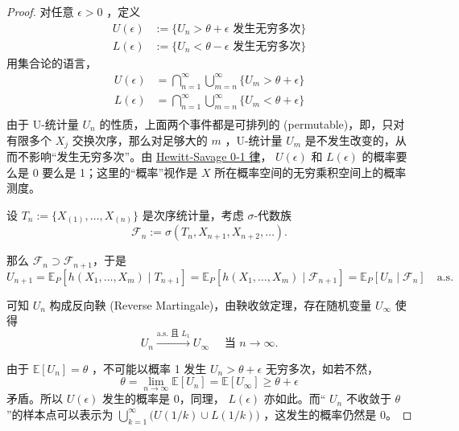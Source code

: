 \begin{proof}

对任意 $\epsilon > 0$ ，定义
\[\begin{aligned} U(\epsilon) &:= \bigl\{ U_n > \theta + \epsilon \text{ 发生无穷多次} \bigr\}\\ L(\epsilon) &:= \bigl\{ U_n < \theta - \epsilon \text{ 发生无穷多次} \bigr\} \end{aligned}\]
用集合论的语言，
\[\begin{aligned} U(\epsilon) &= \bigcap_{n=1}^{\infty} \bigcup_{m=n}^{\infty} \{ U_m > \theta + \epsilon \}\\ L(\epsilon) &= \bigcap_{n=1}^{\infty} \bigcup_{m=n}^{\infty} \{ U_m < \theta + \epsilon \}\\  \end{aligned}\]
由于 U-统计量 $U_n$ 的性质，上面两个事件都是可排列的 (permutable)，即，只对有限多个 $X_j$ 交换次序，那么对足够大的 $m$ ，U-统计量 $U_m$ 是不发生改变的，从而不影响``发生无穷多次''。由 \href{https://en.wikipedia.org/wiki/Hewitt\%E2\%80\%93Savage_zero\%E2\%80\%93one_law}{Hewitt‑Savage 0‑1 律}， $U(\epsilon)$ 和 $L(\epsilon)$ 的概率要么是 0 要么是 1；这里的``概率''视作是 $X$ 所在概率空间的无穷乘积空间上的概率测度。

设 $T_n:=\{X_{(1)},\dots,X_{(n)}\}$ 是次序统计量，考虑 $\sigma$-代数族
\[
\mathscr F_n:=\sigma(T_n,X_{n+1},X_{n+2},\dots).
\]

那么 $\mathscr F_n\supset \mathscr F_{n+1}$，于是\[ U_{n+1}=\mathbb E_P[h(X_1,\dots,X_m)\mid T_{n+1}]=\mathbb E_P[h(X_1,\dots,X_m)\mid \mathscr F_{n+1}]=\mathbb E_P[U_n\mid \mathscr F_n]\quad \text{a.s.} \]

可知 $U_n$ 构成反向鞅 (Reverse Martingale)，由鞅收敛定理，存在随机变量 $U_\infty$ 使得
\[
U_n \xrightarrow{\text{a.s. 且 } L_1} U_\infty \quad \text{ 当 } n \to \infty.
\]

由于 $\mathbb{E}[U_n] = \theta$ ，不可能以概率 1 发生 $U_n > \theta + \epsilon$ 无穷多次，如若不然，
\[ \theta = \lim_{n\to\infty} \mathbb{E}[U_n]=\mathbb E[U_\infty]\ge \theta + \epsilon \]矛盾。所以 $U(\epsilon)$ 发生的概率是 0，同理， $L(\epsilon)$ 亦如此。而`` $U_n$ 不收敛于 $\theta$ ''的样本点可以表示为 $\bigcup_{k=1}^{\infty} \bigl( U(1/k) \cup L(1/k) \bigr)$ ，这发生的概率仍然是 0。

\end{proof}
